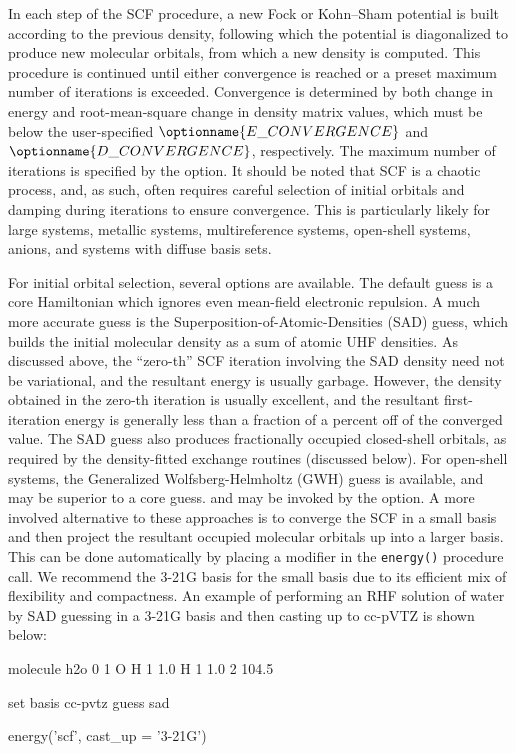In each step of the SCF procedure, a new Fock or Kohn--Sham potential is built
according to the previous density, following which the potential is diagonalized
to produce new molecular orbitals, from which a new density is computed. This
procedure is continued until either convergence is reached or a preset maximum
number of iterations is exceeded. Convergence is determined by both change in
energy and root-mean-square change in density matrix values, which must be below
the user-specified $\optionname{E\_CONVERGENCE}$ and
$\optionname{D\_CONVERGENCE}$, respectively. The maximum number of iterations is
specified by the  option. It should be noted that SCF is a
chaotic process, and, as such, often requires careful selection of initial
orbitals and damping during iterations to ensure convergence. This is
particularly likely for large systems, metallic systems, multireference systems,
open-shell systems, anions, and systems with diffuse basis sets. 

For initial orbital selection, several options are available. The default guess
is a core Hamiltonian which ignores even mean-field electronic repulsion. A much
more accurate guess is the Superposition-of-Atomic-Densities (SAD) guess, which
builds the initial molecular density as a sum of atomic UHF densities. As
discussed above, the ``zero-th'' SCF iteration involving the SAD density need
not be variational, and the resultant energy is usually garbage. However, the
density obtained in the zero-th iteration is usually excellent, and the
resultant first-iteration energy is generally less than a fraction of a percent
off of the converged value. The SAD guess also produces fractionally occupied
closed-shell orbitals, as required by the density-fitted exchange routines
(discussed below). For open-shell systems, the Generalized Wolfsberg-Helmholtz
(GWH) guess is available, and may be superior to a core guess.  and  may
be invoked by the  option. A more involved alternative to these
approaches is to converge the SCF in a small basis and then project the
resultant occupied molecular orbitals up into a larger basis. This can be done
automatically by placing a   modifier in
the \texttt{energy()} procedure call. We recommend the 3-21G basis for the small
basis due to its efficient mix of flexibility and compactness. An example of
performing an RHF solution of water by SAD guessing in a 3-21G basis and then
casting up to cc-pVTZ is shown below: 
\begin{Snippet}
molecule h2o {
0 1
O
H 1 1.0
H 1 1.0 2 104.5
}

set {
basis cc-pvtz 
guess sad
}

energy('scf', cast_up = '3-21G')
\end{Snippet}

